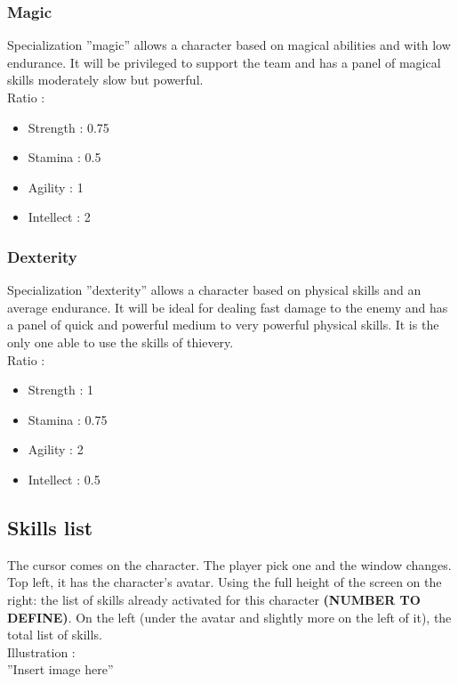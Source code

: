 \documentclass[a4paper,12pt]{book}
\begin{document}
\subsubsection{Magic}
Specialization ''magic'' allows a character based on magical abilities and with low endurance. It will be privileged to support the team and has a panel of magical skills moderately slow but powerful. \\
Ratio :
\begin{itemize}
	\item Strength : 0.75
	\item Stamina : 0.5
	\item Agility : 1
	\item Intellect : 2
\end{itemize}
\subsubsection{Dexterity}
Specialization ''dexterity'' allows a character based on physical skills and an average endurance. It will be ideal for dealing fast damage to the enemy and has a panel of quick and powerful medium to very powerful physical skills. It is the only one able to use the skills of thievery. \\
Ratio :
\begin{itemize}
	\item Strength : 1
	\item Stamina : 0.75
	\item Agility : 2
	\item Intellect : 0.5
\end{itemize}
\subsection{Skills list}
The cursor comes on the character. The player pick one and the window changes. Top left, it has the character's avatar. Using the full height of the screen on the right: the list of skills already activated for this character \textbf{(NUMBER TO DEFINE)}. On the left (under the avatar and slightly more on the left of it), the total list of skills. \\ Illustration : \\ ''Insert image here''
\end{document}
